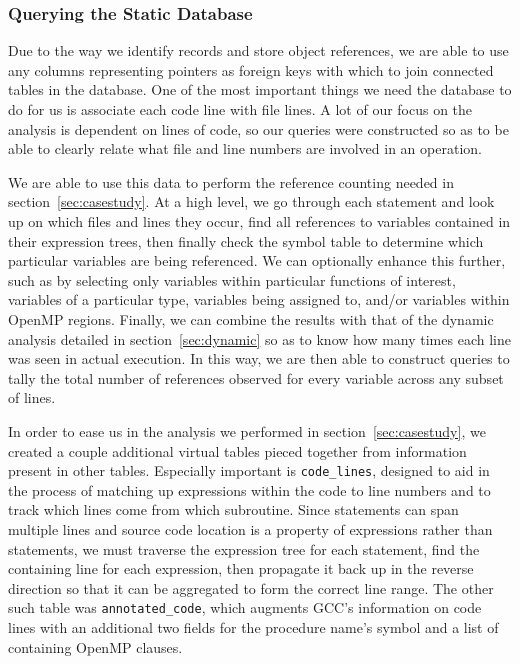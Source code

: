 \subsubsection{Querying the Static Database}
\label{sec:querying}
Due to the way we identify records and store object references, we are able to use any columns representing pointers as foreign keys with which to join connected tables in the database.
One of the most important things we need the database to do for us is associate each code line with file lines.
A lot of our focus on the analysis is dependent on lines of code, so our queries were constructed so as to be able to clearly relate what file and line numbers are involved in an operation.

We are able to use this data to perform the reference counting needed in section~\ref{sec:casestudy}.
At a high level, we go through each statement and look up on which files and lines they occur, find all references to variables contained in their expression trees, then finally check the symbol table to determine which particular variables are being referenced.
We can optionally enhance this further, such as by selecting only variables within particular functions of interest, variables of a particular type, variables being assigned to, and/or variables within OpenMP regions.
Finally, we can combine the results with that of the dynamic analysis detailed in section~\ref{sec:dynamic} so as to know how many times each line was seen in actual execution.
In this way, we are then able to construct queries to tally the total number of references observed for every variable across any subset of lines.

In order to ease us in the analysis we performed in section~\ref{sec:casestudy}, we created a couple additional virtual tables pieced together from information present in other tables.
Especially important is \texttt{code\_lines}, designed to aid in the process of matching up expressions within the code to line numbers and to track which lines come from which subroutine.
Since statements can span multiple lines and source code location is a property of expressions rather than statements, we must traverse the expression tree for each statement, find the containing line for each expression, then propagate it back up in the reverse direction so that it can be aggregated to form the correct line range.
The other such table was \texttt{annotated\_code}, which augments \acs{GCC}'s information on code lines with an additional two fields for the procedure name's symbol and a list of containing OpenMP clauses.

